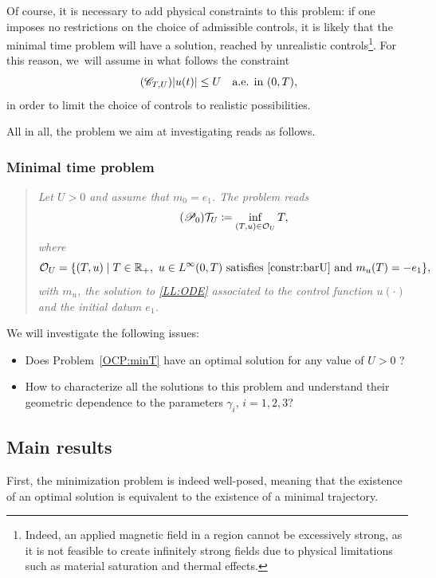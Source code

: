 \documentclass[10pt]{amsart}
\let\Subsubsection\subsubsection
\theoremstyle{definition}
\newcommand{\R} {\mathbb{R}}
\begin{document}
Of course, it is necessary to add physical constraints to this problem: if one imposes no restrictions on the choice of admissible controls, it is likely that the minimal time problem will have a solution, reached by unrealistic controls\footnote{{Indeed, an applied magnetic field in a region cannot be excessively strong, as it is not feasible to create infinitely strong fields due to physical limitations such as material saturation and thermal effects. }}.
For this reason, we~will assume in what follows the constraint
\begin{equation}\label{constr:barU}\tag{$\mathscr{C}_{T,U }$}
|u(t)|\leq U \quad \text{a.e. in }(0,T),
\end{equation}
in order to limit the choice of controls to realistic possibilities.

All in all, the problem we aim at investigating reads as follows.

\Subsubsection*{Minimal time problem}
\begin{quote}
\textit{Let $U >0$ and assume that $m_0=e_1$. The problem reads
\begin{equation}\label{OCP:minT}\tag{$\mathscr{P}_0$}
\mathcal{T}_{U } \coloneqq \inf_{(T,u)\in \mathcal{O}_{U }}T,
\end{equation}
where
\[
\mathcal{O}_{U }=\{(T,u)\mid T\in \R_+, \ u\in L^\infty(0,T)\text{ satisfies }\eqref{constr:barU}\text{ and }m_u(T)=-e_1\},
\]
with $m_u$, the solution to \eqref{LL:ODE} associated to the control function $u(\cdot)$ and the initial datum $e_1$.}
\end{quote}

We will investigate the following issues:
\begin{itemize}
\item Does Problem~\eqref{OCP:minT} have an optimal solution for any value of $U >0$ ?
\item How to characterize all the solutions to this problem and understand their geometric dependence to the parameters $\gamma_i$, $i=1,2,3$?
\end{itemize}

\subsection{Main results}\label{sec:mainRes}

First, the minimization problem is indeed well-posed, meaning that the existence of an optimal solution is equivalent to the existence of a minimal trajectory.
\end{document}
